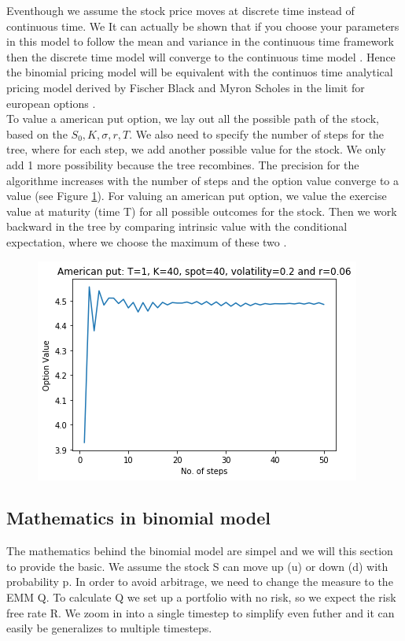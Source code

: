 Eventhough we assume the stock price moves at discrete time instead of continuous time. We
It can actually be shown that if you choose your parameters in this model to follow the mean and variance in the continuous time framework then the discrete time model will converge to the continuous time model \parencite{binomial-Paper}. Hence the binomial pricing model will be equivalent with the continuos time analytical pricing model derived by Fischer Black and Myron Scholes in the limit for european options \parencite{binomial-Paper}.\\

To value a american put option, we lay out all the possible path of the stock, based on the $S_0, K, \sigma, r, T$. We also need to specify the number of steps for the tree, where for each step, we add another possible value for the stock. We only add 1 more possibility because the tree recombines. The precision for the algorithme increases with the number of steps and the option value converge to a value (see Figure \ref{fig:binConv}). For valuing an american put option, we value the exercise value at maturity (time T) for all possible outcomes for the stock. Then we work backward in the tree by comparing intrinsic value with the conditional expectation, where we choose the maximum of these two \parencite{Hull}. 
 
\begin{figure}[th]
\centering
\includegraphics{Figures/binConv.png}
\decoRule
\caption[Convergence of Binomial model]{}
\label{fig:binConv}
\end{figure}



\subsection{Mathematics in binomial model}
The mathematics behind the binomial model are simpel and we will this section to provide the basic.
We assume the stock S can move up (u) or down (d) with probability p. In order to avoid arbitrage, we need to change the measure to the EMM Q. To calculate Q we set up a portfolio with no risk, so we expect the risk free rate R. We zoom in into a single timestep to simplify even futher and it can easily be generalizes to multiple timesteps.

